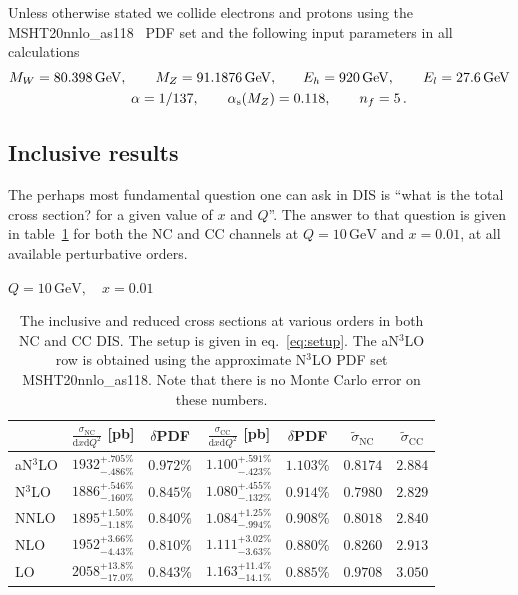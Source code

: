 \documentclass[submission, PhysCodeb]{SciPost}
\newcommand{\as}{\alpha_{\mathrm{s}}}
\newcommand{\dd}{\mathrm{d}}
\newcommand{\NC}{\mathrm{NC}}
\newcommand{\CC}{\mathrm{CC}}
\newcommand{\GEV}{\,\mathrm{GeV}}
\newcommand{\NNNLO}{N$^3$LO}
\begin{document}
Unless otherwise stated we collide electrons and protons using the
MSHT20nnlo\_as118~\cite{Bailey:2020ooq} PDF set and the following
input parameters in all calculations
\begin{align}
  \label{eq:setup}
  M_W = 80.398\GEV, \qquad M_Z = 91.1876\GEV, &\qquad E_h = 920\GEV, \qquad E_l = 27.6\GEV  \\ \notag
  \alpha = 1/137, \qquad \as(M_Z) &= 0.118, \qquad n_f = 5\,.
\end{align}

\subsection{Inclusive results}
The perhaps most fundamental question one can ask in DIS is ``what is
the total cross section? for a given value of $x$ and $Q$''. The
answer to that question is given in table~\ref{tab:cross-sections} for
both the NC and CC channels at $Q=10\GEV$ and $x=0.01$, at all
available perturbative orders.
\begin{table}[t] 
  \centering
  \phantom{x}\medskip%
  \begin{center} $Q = 10\GEV,\quad x = 0.01$\end{center}
  {\renewcommand{\arraystretch}{1.2}
  \begin{tabular}{lcccc|cc}
    \toprule
    & $\frac{\sigma_\NC}{\dd x \dd Q^2}$ [pb] & $\delta$PDF & $\frac{\sigma_\CC}{\dd x \dd Q^2}$ [pb] & $\delta$PDF & $\tilde{\sigma}_\NC$  & $\tilde{\sigma}_\CC$ \\ 
    \midrule
    a\NNNLO & $1932^{+.705\%}_{-.486\%}$ & $0.972\%$ & $1.100^{+.591\%}_{-.423\%}$ & $1.103\%$ & $0.8174$ & $2.884$\\    
    \NNNLO  & $1886^{+.546\%}_{-.160\%}$ & $0.845\%$ & $1.080^{+.455\%}_{-.132\%}$ & $0.914\%$ & $0.7980$ & $2.829$\\    
    NNLO    & $1895^{+1.50\%}_{-1.18\%}$ & $0.840\%$ & $1.084^{+1.25\%}_{-.994\%}$ & $0.908\%$ & $0.8018$ & $2.840$\\    
    NLO     & $1952^{+3.66\%}_{-4.43\%}$ & $0.810\%$ & $1.111^{+3.02\%}_{-3.63\%}$ & $0.880\%$ & $0.8260$ & $2.913$\\    
    LO      & $2058^{+13.8\%}_{-17.0\%}$ & $0.843\%$ & $1.163^{+11.4\%}_{-14.1\%}$ & $0.885\%$ & $0.9708$ & $3.050$\\    
    \bottomrule
  \end{tabular}}
  \caption{The inclusive and reduced cross sections at various orders
    in both NC and CC DIS. The setup is given in
    eq.~\eqref{eq:setup}. The a\NNNLO{} row is obtained using the
    approximate \NNNLO{} PDF set MSHT20nnlo\_as118. Note that there is
    no Monte Carlo error on these numbers.}
\label{tab:cross-sections}
\end{table}
\end{document}
